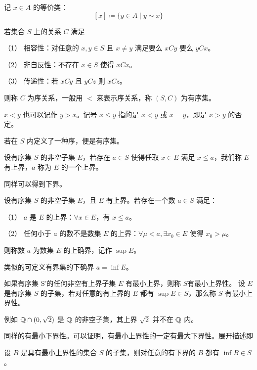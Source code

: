 记 $x\in A$ 的等价类：
$$[x] \coloneqq  \{y \in A \mid y \sim x\}$$ 

\begin{definition}[序关系]
	若集合 $S$ 上的关系 $C$ 满足

	（1） 相容性：对任意的 $x,y\in S$ 且 $x\ne y$ 满足要么 $xCy$ 要么 $yCx$。
	
	（2） 非自反性：不存在 $x\in S$ 使得 $xCx$。

	（3） 传递性：若 $xCy$ 且 $yCz$ 则 $xCz$。

	则称 $C$ 为序关系，一般用 $<$ 来表示序关系，称 $(S,C)$ 为有序集。
\end{definition}

$x<y$ 也可以记作 $y>x$。记号 $x\leqslant y$ 指的是 $x<y$ 或 $x=y$，即是 $x>y$ 的否定。

若在 $S$ 内定义了一种序，便是有序集。

\begin{definition}[上界]
	设有序集 $S$ 的非空子集 $E$，若存在 $a \in S$ 使得任取 $x\in E$ 满足 $x \leqslant a$，我们称 $E$ 有上界，$a$ 称为 $E$ 的一个上界。 
\end{definition}

同样可以得到下界。

\begin{definition}[上确界]
	设有序集 $S$ 的非空子集 $E$，且 $E$ 有上界。若存在一个数 $a \in S$ 满足：
	
	（1） $a$ 是 $E$ 的上界：$\forall x\in E$，有 $x\leqslant a$。
	
	（2） 任何小于 $a$ 的数不是数集 $E$ 的上界：$\forall \mu<a, \exists x_0\in E$ 使得 $x_0>\mu$。
	
	则称数 $a$ 为数集 $E$ 的上确界，记作 $\sup E$。
\end{definition}

类似的可定义有界集的下确界 $a=\inf E$。

\begin{definition}[最小上界性]
	如果有序集 S'的任何非空有上界子集 $E$ 有最小上界，则称 $S$有最小上界性。
	设 $E$ 是有序集 $S$ 的子集，若对任意的有上界的 $E$ 都有 $\sup E \in S$，那么称 $S$ 有最小上界性。
\end{definition}

例如 $\mathbb{Q} \cap (0,\sqrt2)$ 是 $\mathbb{Q}$ 的非空子集，其上界 $\sqrt2$ 并不在 $\mathbb{Q}$ 内。

同样的有最小下界性。可以证明，有最小上界性的一定有最大下界性。展开描述即

\begin{theorem}
	设 $B$ 是具有最小上界性的集合 $S$ 的子集，则对任意的有下界的 $B$ 都有 $\inf B \in S$。
\end{theorem}

